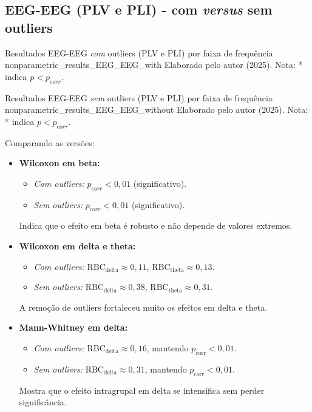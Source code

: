 \subsection{EEG-EEG (PLV e PLI) - com \textit{versus} sem outliers}

{Resultados EEG-EEG \textit{com} outliers (PLV e PLI) por faixa de frequência}
{nonparametric_results_EEG_EEG_with}
{Elaborado pelo autor (2025). Nota: * indica $p<p_{\mathrm corr}$.}

{Resultados EEG-EEG \textit{sem} outliers (PLV e PLI) por faixa de frequência}
{nonparametric_results_EEG_EEG_without}
{Elaborado pelo autor (2025). Nota: * indica $p<p_{\mathrm corr}$.}

Comparando as versões:
\begin{itemize}
  \item \textbf{Wilcoxon em beta:}  
    \begin{itemize}
      \item \emph{Com outliers:} $p_{\mathrm corr}<0{,}01$ (significativo).  
      \item \emph{Sem outliers:} $p_{\mathrm corr}<0{,}01$ (significativo).  
    \end{itemize}
    Indica que o efeito em beta é robusto e não depende de valores extremos.
  \item \textbf{Wilcoxon em delta e theta:}  
    \begin{itemize}
      \item \emph{Com outliers:} $\mathrm{RBC}_{\text{delta}} \approx 0{,}11$, $\mathrm{RBC}_{\text{theta}} \approx 0{,}13$.
      \item \emph{Sem outliers:} $\mathrm{RBC}_{\text{delta}} \approx 0{,}38$, $\mathrm{RBC}_{\text{theta}} \approx 0{,}31$.
    \end{itemize}
    A remoção de outliers fortaleceu muito os efeitos em delta e theta.
  \item \textbf{Mann-Whitney em delta:}  
    \begin{itemize}
      \item \emph{Com outliers:} $\mathrm{RBC}_{\text{delta}} \approx 0{,}16$, mantendo $p_{\mathrm{corr}} < 0{,}01$.
      \item \emph{Sem outliers:} $\mathrm{RBC}_{\text{delta}} \approx 0{,}31$, mantendo $p_{\mathrm{corr}} < 0{,}01$.
    \end{itemize}
    Mostra que o efeito intragrupal em delta se intensifica sem perder significância.
\end{itemize}

